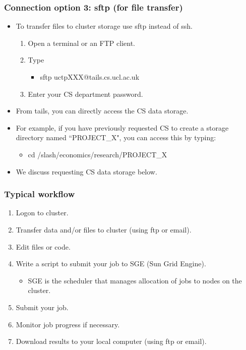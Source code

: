 \documentclass{beamer}
\begin{document}
\begin{frame}
\frametitle{Connection option 3: sftp (for file transfer)}
\begin{itemize}
\item To transfer files to cluster storage use sftp instead of ssh.
\begin{enumerate}
\item Open a terminal or an FTP client.
\item Type
\begin{itemize}
\item sftp uctpXXX@tails.cs.ucl.ac.uk
\end{itemize}
\item Enter your CS department password.
\end{enumerate}
\item From tails, you can directly access the CS data storage. 
\item For example, if you have previously  requested CS to 
create a storage directory named ``PROJECT\_X", you can access this by typing:
\begin{itemize}
\item cd /slash/economics/research/PROJECT\_X
\end{itemize}
\item We discuss requesting CS data storage below.
\end{itemize}
\end{frame}

\begin{frame}
\frametitle{Typical workflow}
\begin{enumerate}
\item Logon to cluster.
\item Transfer data and/or files to cluster (using ftp or email).
\item Edit files or code.
\item Write a script to submit your job to SGE (Sun Grid Engine).
\begin{itemize}
\item SGE is the scheduler that manages allocation of jobs to nodes on the cluster.
\end{itemize}
\item Submit your job.
\item Monitor job progress if necessary. 
\item Download results to your local computer (using ftp or email).
\end{enumerate}

\end{frame}
\end{document}
